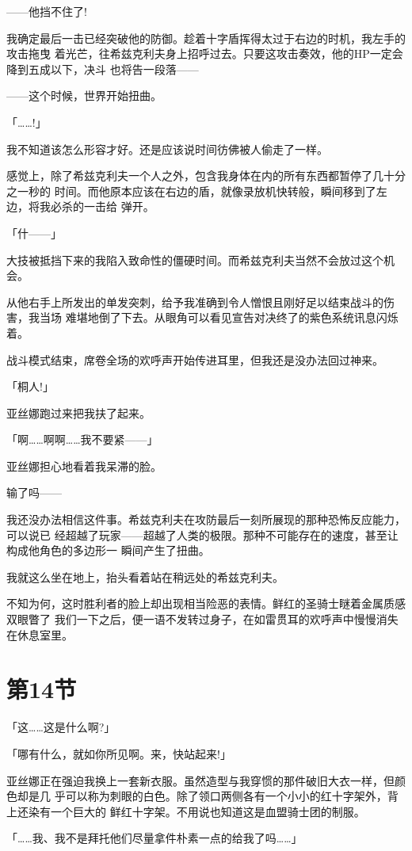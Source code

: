 \documentclass[11pt]{book}
\begin{document}
——他挡不住了!

我确定最后一击已经突破他的防御。趁着十字盾挥得太过于右边的时机，我左手的攻击拖曳
着光芒，往希兹克利夫身上招呼过去。只要这攻击奏效，他的HP一定会降到五成以下，决斗
也将告一段落——

——这个时候，世界开始扭曲。

「……!」

我不知道该怎么形容才好。还是应该说时间彷佛被人偷走了一样。

感觉上，除了希兹克利夫一个人之外，包含我身体在内的所有东西都暂停了几十分之一秒的
时间。而他原本应该在右边的盾，就像录放机快转般，瞬间移到了左边，将我必杀的一击给
弹开。

「什——」

大技被抵挡下来的我陷入致命性的僵硬时间。而希兹克利夫当然不会放过这个机会。

从他右手上所发出的单发突刺，给予我准确到令人憎恨且刚好足以结束战斗的伤害，我当场
难堪地倒了下去。从眼角可以看见宣告对决终了的紫色系统讯息闪烁着。

战斗模式结束，席卷全场的欢呼声开始传进耳里，但我还是没办法回过神来。

「桐人!」

亚丝娜跑过来把我扶了起来。

「啊……啊啊……我不要紧——」

亚丝娜担心地看着我呆滞的脸。

输了吗——

我还没办法相信这件事。希兹克利夫在攻防最后一刻所展现的那种恐怖反应能力，可以说已
经超越了玩家——超越了人类的极限。那种不可能存在的速度，甚至让构成他角色的多边形一
瞬间产生了扭曲。

我就这么坐在地上，抬头看着站在稍远处的希兹克利夫。

不知为何，这时胜利者的脸上却出现相当险恶的表情。鲜红的圣骑士瞇着金属质感双眼瞥了
我们一下之后，便一语不发转过身子，在如雷贯耳的欢呼声中慢慢消失在休息室里。
\section{第14节}
\label{sec:org6436904}
「这……这是什么啊?」

「哪有什么，就如你所见啊。来，快站起来!」

亚丝娜正在强迫我换上一套新衣服。虽然造型与我穿惯的那件破旧大衣一样，但颜色却是几
乎可以称为刺眼的白色。除了领口两侧各有一个小小的红十字架外，背上还染有一个巨大的
鲜红十字架。不用说也知道这是血盟骑士团的制服。

「……我、我不是拜托他们尽量拿件朴素一点的给我了吗……」
\end{document}
